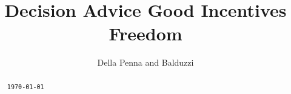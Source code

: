 



\title{Decision Advice Good Incentives Freedom}

\author{Della Penna and Balduzzi}



\begin{abstract}%
  \begin{center}
    \texttt{\today}
  \end{center}
\end{abstract}




\maketitle





{


}


